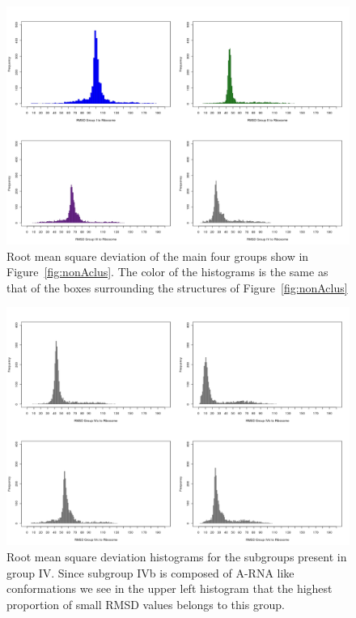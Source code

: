 \begin{figure}[htbp]
 \centering
\includegraphics[angle=90, scale=0.6]{Chapter2/RMSDschneider1.png}
\caption{Root mean square deviation of the main four groups show in
  Figure~\ref{fig:nonAclus}. The color of the histograms is the same
  as that of the boxes surrounding the structures of
  Figure~\ref{fig:nonAclus}}
 \label{fig:histo1}
\end{figure}

\begin{figure}[htbp]
 \centering
\includegraphics[angle=90, scale=0.6]{Chapter2/RMSDschneider2.png}
\caption{Root  mean  square  deviation  histograms for  the  subgroups
  present in group  IV.  Since subgroup IVb is  composed of A-RNA like
  conformations we  see in the  upper left histogram that  the highest
  proportion of small RMSD values belongs to this group.}
 \label{fig:histo2}
\end{figure}

